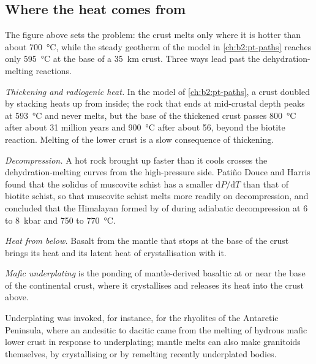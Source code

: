 \subsection*{Where the heat comes from}

The figure above sets the problem: the crust melts only where it is hotter than about
\qty{700}{\celsius}, while the steady geotherm of the model in \cref{ch:b2:pt-paths}
reaches only \qty{595}{\celsius} at the base of a \qty{35}{km} crust. Three ways lead
past the dehydration-melting reactions.

\emph{Thickening and radiogenic heat.} In the model of \cref{ch:b2:pt-paths}, a crust
doubled by stacking heats up from inside; the rock that ends at mid-crustal depth peaks at
\qty{593}{\celsius} and never melts, but the base of the thickened crust passes
\qty{800}{\celsius} after about 31 million years and \qty{900}{\celsius} after about 56, beyond
the biotite reaction. Melting of the lower crust is a slow consequence of thickening.

\emph{Decompression.} A hot rock brought up faster than it cools crosses the
dehydration-melting curves from the high-pressure side. Patiño Douce and Harris found that
the solidus of muscovite schist has a smaller $\mathrm{d}P/\mathrm{d}T$ than that of
biotite schist, so that muscovite schist melts more readily on decompression, and
concluded that the Himalayan  formed by  of 
during adiabatic decompression at 6 to \qty{8}{kbar} and 750 to \qty{770}{\celsius}.

\emph{Heat from below.} Basalt from the mantle that stops at the base of the crust brings
its heat and its latent heat of crystallisation with it.

\begin{definition}\label{def:b2:crustal-melting:underplating}
\emph{Mafic underplating} is the ponding of mantle-derived
basaltic  at or near the base of the continental crust, where it crystallises and
releases its heat into the crust above.
\end{definition}

Underplating was invoked, for instance, for the rhyolites of the Antarctic Peninsula,
where an andesitic to dacitic  came from the melting of hydrous mafic lower crust in
response to underplating; mantle melts can also make granitoids themselves, by
crystallising or by remelting recently underplated bodies.


